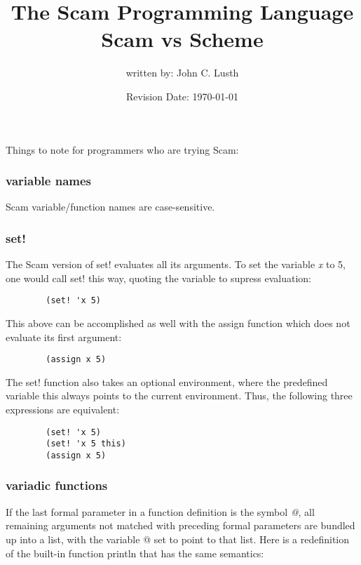 \documentclass{article}
\title{The Scam Programming Language\\
Scam vs Scheme}
\author{written by: John C. Lusth}
\date{Revision Date: \today}
\begin{document}
\maketitle

\W{}

Things to note for programmers who are trying Scam:

\subsubsection*{variable names}

    Scam variable/function names are case-sensitive.

\subsubsection*{set!}

    The Scam version of set! evaluates all its arguments. To set the variable
    {\it x} to 5, one would call set! this way, quoting the variable to supress
    evaluation:
    
\begin{verbatim}
        (set! 'x 5)
\end{verbatim}

    This above can be accomplished as well with the assign function which 
    does not evaluate its first argument:

\begin{verbatim}
        (assign x 5)
\end{verbatim}

    The set! function also takes an optional environment, where the predefined
    variable this always points to the current environment. Thus, the following
    three expressions are equivalent:

\begin{verbatim}
        (set! 'x 5)
        (set! 'x 5 this)
        (assign x 5)
\end{verbatim}

\subsubsection*{variadic functions}

    If the last formal parameter in a function definition is the
    symbol {\it @}, all remaining arguments not matched with 
    preceding formal parameters are bundled up into a list, with
    the variable @ set to point to that list. Here is a redefinition
    of the built-in function println that has the same semantics:
\end{document}
